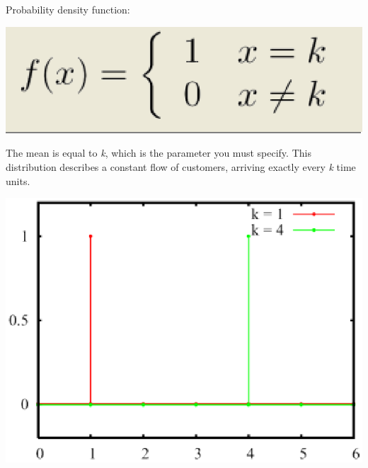 \\\\
\noindent Probability density function:
\begin{center}
\includegraphics[scale=.5]{img/jsim/constant1.eps}
\end{center}

The mean is equal to \emph{k}, which is the parameter  you must specify.
This distribution describes a constant flow of customers, arriving exactly every \emph{k} time units.\\
\begin{center}
\includegraphics[scale=.5]{img/jsim/const_pdf.eps}
\end{center}


